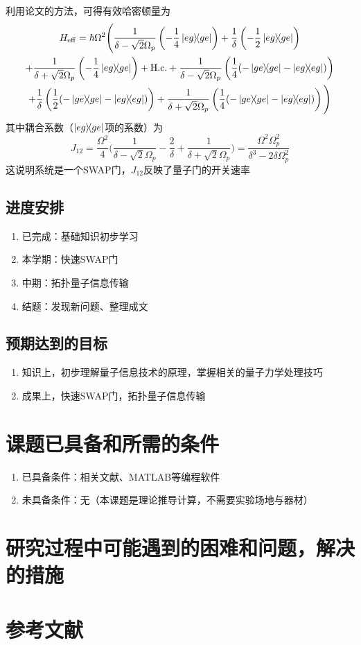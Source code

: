 \documentclass[fontset=windows,toc=true,type=bachelor,stage=opening,campus=weihai]{hithesisart}
\begin{document}
\begin{enumerate}
利用论文\cite{James2007EffectiveHT}的方法，可得有效哈密顿量为
\begin{multline}
H_{\mathrm{eff}}=\hbar\Omega^2\Bigg(\frac{1}{\delta-\sqrt{2}\Omega_p}\left(-\frac{1}{4}\ketbra{eg}{ge}\right)+\frac{1}{\delta}\left(-\frac{1}{2}\ketbra{eg}{ge}\right)\\
+\frac{1}{\delta+\sqrt{2}\Omega_p}\left(-\frac{1}{4}\ketbra{eg}{ge}\right)+\mathrm{H.c.}
+\frac{1}{\delta-\sqrt{2}\Omega_p}\left(\frac{1}{4}(-\ketbra{ge}{ge}-\ketbra{eg}{eg})\right)\\
+\frac{1}{\delta}\left(\frac{1}{2}(-\ketbra{ge}{ge}-\ketbra{eg}{eg})\right)
+\frac{1}{\delta+\sqrt{2}\Omega_p}\left(\frac{1}{4}(-\ketbra{ge}{ge}-\ketbra{eg}{eg})\right)\Bigg)
\end{multline}
其中耦合系数（$ \ketbra{eg}{ge} $项的系数）为
\begin{equation}
J_{12}=\frac{\Omega^2}{4}\Bigg(\frac{1}{\delta-\sqrt{2}\Omega_p}-\frac{2}{\delta}+\frac{1}{\delta+\sqrt{2}\Omega_p}\Bigg)=\frac{\Omega^2\Omega_p^2}{\delta^3-2\delta\Omega_p^2}
\end{equation}
这说明系统是一个SWAP门，$ J_{12} $反映了量子门的开关速率


\end{enumerate}
\subsection{进度安排}
\begin{enumerate}
\item 已完成：基础知识初步学习
\item 本学期：快速SWAP门
\item 中期：拓扑量子信息传输
\item 结题：发现新问题、整理成文
\end{enumerate}
\subsection{预期达到的目标}
\begin{enumerate}
\item 知识上，初步理解量子信息技术的原理，掌握相关的量子力学处理技巧
\item 成果上，快速SWAP门，拓扑量子信息传输
\end{enumerate}
\section{课题已具备和所需的条件}
\begin{enumerate}
\item 已具备条件：相关文献、MATLAB等编程软件
\item 未具备条件：无（本课题是理论推导计算，不需要实验场地与器材）
\end{enumerate}
\section{研究过程中可能遇到的困难和问题，解决的措施}
\section{参考文献}



\makebackcover
\end{document}
